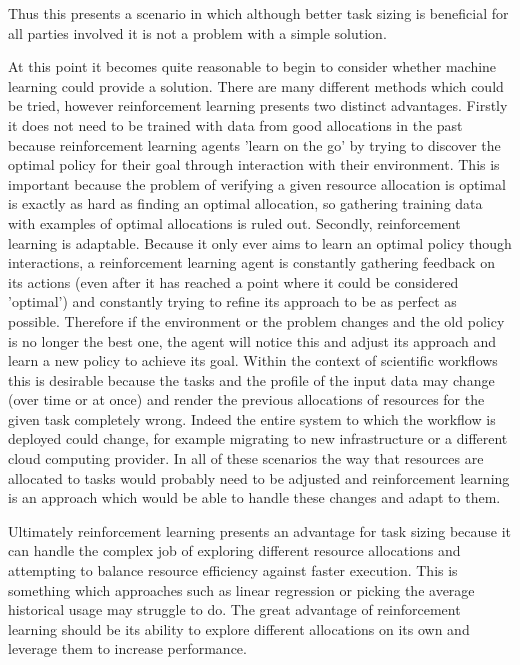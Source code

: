 Thus this presents a scenario in which although better task sizing is beneficial for all parties involved it is not a problem with a simple solution.

At this point it becomes quite reasonable to begin to consider whether machine learning could provide a solution. There are many different methods which could be tried, however reinforcement learning presents two distinct advantages. Firstly it does not need to be trained with data from good allocations in the past because reinforcement learning agents 'learn on the go' by trying to discover the optimal policy for their goal through interaction with their environment. This is important because the problem of verifying a given resource allocation is optimal is exactly as hard as finding an optimal allocation, so gathering training data with examples of optimal allocations is ruled out. Secondly, reinforcement learning is adaptable. Because it only ever aims to learn an optimal policy though interactions, a reinforcement learning agent is constantly gathering feedback on its actions (even after it has reached a point where it could be considered 'optimal') and constantly trying to refine its approach to be as perfect as possible. Therefore if the environment or the problem changes and the old policy is no longer the best one, the agent will notice this and adjust its approach and learn a new policy to achieve its goal. Within the context of scientific workflows this is desirable because the tasks and the profile of the input data may change (over time or at once) and render the previous allocations of resources for the given task completely wrong. Indeed the entire system to which the workflow is deployed could change, for example migrating to new infrastructure or a different cloud computing provider. In all of these scenarios the way that resources are allocated to tasks would probably need to be adjusted and reinforcement learning is an approach which would be able to handle these changes and adapt to them.

Ultimately reinforcement learning presents an advantage for task sizing because it can handle the complex job of exploring different resource allocations and attempting to balance resource efficiency against faster execution. This is something which approaches such as linear regression or picking the average historical usage may struggle to do. The great advantage of reinforcement learning should be its ability to explore different allocations on its own and leverage them to increase performance.

